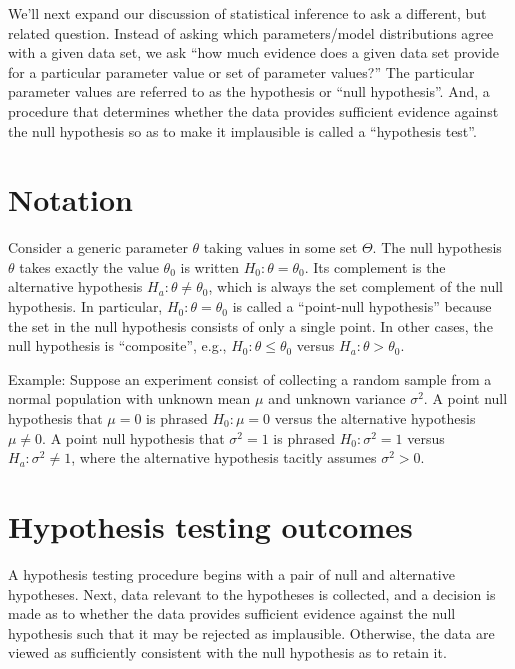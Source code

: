 \documentclass[
]{book}
\begin{document}
We'll next expand our discussion of statistical inference to ask a different, but related question. Instead of asking which parameters/model distributions agree with a given data set, we ask ``how much evidence does a given data set provide for a particular parameter value or set of parameter values?'' The particular parameter values are referred to as the hypothesis or ``null hypothesis''. And, a procedure that determines whether the data provides sufficient evidence against the null hypothesis so as to make it implausible is called a ``hypothesis test''.

\hypertarget{notation}{%
\section{Notation}\label{notation}}

Consider a generic parameter \(\theta\) taking values in some set \(\Theta\). The null hypothesis \(\theta\) takes exactly the value \(\theta_0\) is written \(H_0: \theta = \theta_0\). Its complement is the alternative hypothesis \(H_a: \theta\ne\theta_0\), which is always the set complement of the null hypothesis. In particular, \(H_0: \theta = \theta_0\) is called a ``point-null hypothesis'' because the set in the null hypothesis consists of only a single point. In other cases, the null hypothesis is ``composite'', e.g., \(H_0:\theta \leq \theta_0\) versus \(H_a: \theta > \theta_0\).

Example: Suppose an experiment consist of collecting a random sample from a normal population with unknown mean \(\mu\) and unknown variance \(\sigma^2\). A point null hypothesis that \(\mu = 0\) is phrased \(H_0: \mu = 0\) versus the alternative hypothesis \(\mu \ne 0\). A point null hypothesis that \(\sigma^2 = 1\) is phrased \(H_0:\sigma^2=1\) versus \(H_a:\sigma^2 \ne 1\), where the alternative hypothesis tacitly assumes \(\sigma^2>0\).

\hypertarget{hypothesis-testing-outcomes}{%
\section{Hypothesis testing outcomes}\label{hypothesis-testing-outcomes}}

A hypothesis testing procedure begins with a pair of null and alternative hypotheses. Next, data relevant to the hypotheses is collected, and a decision is made as to whether the data provides sufficient evidence against the null hypothesis such that it may be rejected as implausible. Otherwise, the data are viewed as sufficiently consistent with the null hypothesis as to retain it.
\end{document}

